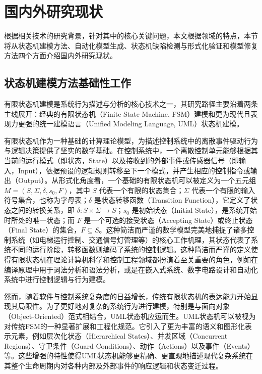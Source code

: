 \section{国内外研究现状}
\label{section-bg}

根据相关技术的研究背景，针对其中的核心关键问题，本文根据领域的特点，本节将从状态机建模方法、自动化模型生成、状态机缺陷检测与形式化验证和模型修复方法四个方面介绍国内外研究现状。

\subsection{状态机建模方法基础性工作}


有限状态机建模是系统行为描述与分析的核心技术之一，其研究路径主要沿着两条主线展开：经典的有限状态机（Finite State Machine, FSM）建模和更为现代且表现力更强的统一建模语言（Unified Modeling Language, UML）状态机建模。

有限状态机作为一种基础的计算理论模型，为描述控制系统中的离散事件驱动行为与逻辑决策提供了坚实的数学基础。在控制系统中，一个离散控制单元能够根据其当前的运行模式（即状态，State）以及接收到的外部事件或传感器信号（即输入，Input），依据预设的逻辑规则转移至下一个模式，并产生相应的控制指令或输出（Output）。从形式化角度看，一个基础的有限状态机可以被定义为一个五元组 \( M = (S, \Sigma, \delta, s_0, F) \)，其中 \(S\) 代表一个有限的状态集合；\(\Sigma\) 代表一个有限的输入符号集合，也称为字母表；\(\delta\) 是状态转移函数（Transition Function），它定义了状态之间的转换关系，即 \(\delta: S \times \Sigma \rightarrow S\)；\(s_0\) 是初始状态（Initial State），是系统开始时所处的唯一状态；而 \(F\) 是一个可选的接受状态（Accepting State）或终止状态（Final State）的集合，\(F \subseteq S\)。这种简洁而严谨的数学模型完美地捕捉了诸多控制系统（如电梯运行控制、交通信号灯管理等）的核心工作机理，其状态代表了系统不同的运行阶段，转移函数则编码了系统的控制逻辑。这种简洁而严谨的定义使得有限状态机在理论计算机科学和控制工程领域都扮演着至关重要的角色，例如在编译原理中用于词法分析和语法分析，或是在嵌入式系统、数字电路设计和自动化系统中进行控制逻辑与行为建模。

然而，随着软件与控制系统复杂度的日益增长，传统有限状态机的表达能力开始显现其局限性。为了更好地对复杂的系统行为进行建模，特别是与面向对象（Object-Oriented）范式相结合，UML状态机应运而生。UML状态机可以被视为对传统FSM的一种显著扩展和工程化规范。它引入了更为丰富的语义和图形化表示元素，例如层次化状态（Hierarchical States）、并发区域（Concurrent Regions）、守卫条件（Guard Conditions）、动作（Actions）以及事件（Events）等。这些增强的特性使得UML状态机能够更精确、更直观地描述现代复杂系统在其整个生命周期内对各种内部及外部事件的响应逻辑和状态变迁过程。

